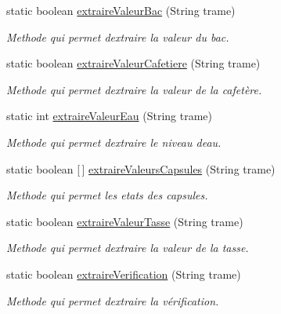 \begin{DoxyCompactItemize}
\item 
static boolean \hyperlink{classcom_1_1example_1_1ekawa_1_1_protocole_a235ca0a3c40a50f4dc75346a60e54917}{extraire\+Valeur\+Bac} (String trame)
\begin{DoxyCompactList}\small\item\em Methode qui permet d\textquotesingle{}extraire la valeur du bac. \end{DoxyCompactList}\item 
static boolean \hyperlink{classcom_1_1example_1_1ekawa_1_1_protocole_abc2f21c6245695c5037bd0a2eac88799}{extraire\+Valeur\+Cafetiere} (String trame)
\begin{DoxyCompactList}\small\item\em Methode qui permet d\textquotesingle{}extraire la valeur de la cafetère. \end{DoxyCompactList}\item 
static int \hyperlink{classcom_1_1example_1_1ekawa_1_1_protocole_ad979442926a41d39052501267b5f5be3}{extraire\+Valeur\+Eau} (String trame)
\begin{DoxyCompactList}\small\item\em Methode qui permet d\textquotesingle{}extraire le niveau d\textquotesingle{}eau. \end{DoxyCompactList}\item 
static boolean \mbox{[}$\,$\mbox{]} \hyperlink{classcom_1_1example_1_1ekawa_1_1_protocole_ab9ea349bfe2b76585f8e71677cacd867}{extraire\+Valeurs\+Capsules} (String trame)
\begin{DoxyCompactList}\small\item\em Methode qui permet les etats des capsules. \end{DoxyCompactList}\item 
static boolean \hyperlink{classcom_1_1example_1_1ekawa_1_1_protocole_ae5e80461f082b4d2e469ee6841b9a380}{extraire\+Valeur\+Tasse} (String trame)
\begin{DoxyCompactList}\small\item\em Methode qui permet d\textquotesingle{}extraire la valeur de la tasse. \end{DoxyCompactList}\item 
static boolean \hyperlink{classcom_1_1example_1_1ekawa_1_1_protocole_add9d5727209d29af21fa468e6929fe0b}{extraire\+Verification} (String trame)
\begin{DoxyCompactList}\small\item\em Methode qui permet d\textquotesingle{}extraire la vérification. \end{DoxyCompactList}\item 

\end{DoxyCompactItemize}
